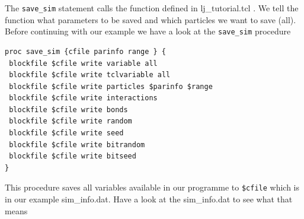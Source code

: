 \documentclass[
paper=a4,                       %
fontsize=11pt,                  %
twoside,                        %
footsepline,                    %
headsepline,                    %
headinclude=false,              %
footinclude=false,              %
pagesize,                       %
]{scrartcl}
\newtheorem{task}{Task}
\begin{document}
\vspace{1cm}
\vspace{1cm}

\noindent 
The  \lstinline|save_sim| statement calls the function defined in lj\_tutorial.tcl . We tell the function what parameters to be saved  and which particles we want to save (all).  Before continuing with our example we have a look at the \lstinline|save_sim| procedure

{\small\vspace{0,2cm}
\begin{lstlisting}[numbers=none]
proc save_sim {cfile parinfo range } {
 blockfile $cfile write variable all
 blockfile $cfile write tclvariable all
 blockfile $cfile write particles $parinfo $range
 blockfile $cfile write interactions
 blockfile $cfile write bonds
 blockfile $cfile write random
 blockfile $cfile write seed
 blockfile $cfile write bitrandom
 blockfile $cfile write bitseed
}
\end{lstlisting}\vspace{0,2cm}
}
\noindent 
This procedure saves all variables available in our programme to \lstinline|$cfile| which is in our example sim\_info.dat. Have a look at the sim\_info.dat to see what that means
\end{document}
